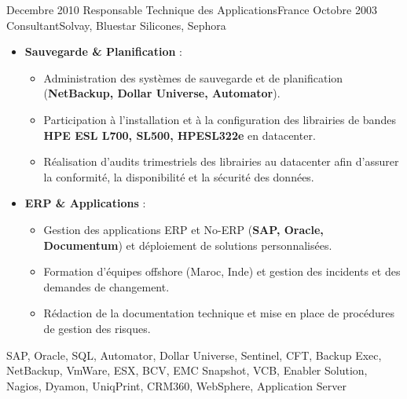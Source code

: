 \begin{experiences}
\consultantexperience
    {Decembre 2010} {Responsable Technique des Applications}{}{France}
    {Octobre 2003}    {Consultant}{Solvay, Bluestar Silicones, Sephora} {
        \begin{itemize}[left=0pt,label={},itemsep=0.5em]
        \vspace{0.3em}  %
          \item \textbf{Sauvegarde \& Planification} :
            \begin{itemize}[itemsep=0.2em,topsep=0.2em,parsep=0pt]
              \small
              \item Administration des systèmes de sauvegarde et de planification (\textbf{NetBackup, Dollar Universe, Automator}).
              \item Participation à l’installation et à la configuration des librairies de bandes \textbf{HPE ESL L700, SL500, HPESL322e} en datacenter.
              \item Réalisation d’audits trimestriels des librairies au datacenter afin d’assurer la conformité, la disponibilité et la sécurité des données.
            \end{itemize}
        \vspace{0.3em}  %
          \item \textbf{ERP \& Applications} :
            \begin{itemize}[itemsep=0.2em,topsep=0.2em,parsep=0pt]
              \small
              \item Gestion des applications ERP et No-ERP (\textbf{SAP, Oracle, Documentum}) et déploiement de solutions personnalisées.
              \item Formation d’équipes offshore (Maroc, Inde) et gestion des incidents et des demandes de changement.
              \item Rédaction de la documentation technique et mise en place de procédures de gestion des risques.
            \end{itemize}
        \end{itemize}
        \vspace{0.3em}
    }
    {SAP, Oracle, SQL, Automator, Dollar Universe, Sentinel, CFT, Backup Exec, NetBackup, VmWare, ESX, BCV, EMC Snapshot, VCB, Enabler Solution, Nagios, Dyamon, UniqPrint, CRM360, WebSphere, Application Server}

\emptySeparator
\end{experiences}